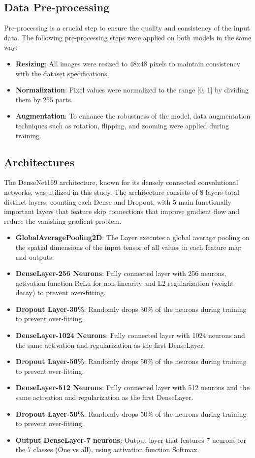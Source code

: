 \documentclass[conference]{IEEEtran}
\begin{document}
\subsection{Data Pre-processing}
Pre-processing is a crucial step to ensure the quality and consistency of the input data. The following pre-processing steps were applied on both models in the same way:

\begin{itemize}
    \item \textbf{Resizing}: All images were resized to 48x48 pixels to maintain consistency with the dataset specifications.
    \item \textbf{Normalization}: Pixel values were normalized to the range [0, 1] by dividing them by 255 parts.
    \item \textbf{Augmentation}: To enhance the robustness of the model, data augmentation techniques such as rotation, flipping, and zooming were applied during training.
\end{itemize}

\subsection{Architectures}
The DenseNet169 architecture, known for its densely connected convolutional networks, was utilized in this study. The architecture consists of 8 layers total distinct layers, counting each Dense and Dropout, with 5 main functionally important layers that feature skip connections that improve gradient flow and reduce the vanishing gradient problem.
\begin{itemize}
    \item \textbf{GlobalAveragePooling2D}: The Layer executes a global average pooling on the spatial dimensions of the input tensor of all values in each feature map and outputs.
    \item \textbf{DenseLayer-256 Neurons}: Fully connected layer with 256 neurons, activation function ReLu for non-linearity and L2 regularization (weight decay) to prevent over-fitting.
    \item \textbf{Dropout Layer-30\%}: Randomly drops 30\% of the neurons during training to prevent over-fitting.
    \item \textbf{DenseLayer-1024 Neurons}: Fully connected layer with 1024 neurons and the same activation and regularization as the first DenseLayer.
    \item \textbf{Dropout Layer-50\%}: Randomly drops 50\% of the neurons during training to prevent over-fitting.
    \item \textbf{DenseLayer-512 Neurons}: Fully connected layer with 512 neurons and the same activation and regularization as the first DenseLayer.
    \item \textbf{Dropout Layer-50\%}: Randomly drops 50\% of the neurons during training to prevent over-fitting.
    \item \textbf{Output DenseLayer-7 neurons}: Output layer that features 7 neurons for the 7 classes (One vs all), using activation function Softmax.
\end{itemize}
\end{document}
